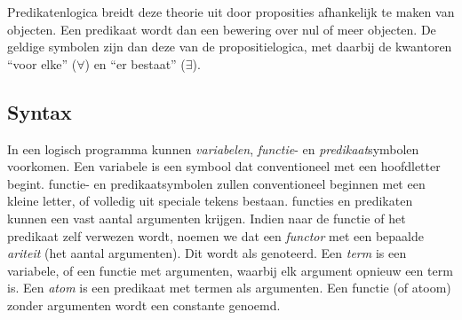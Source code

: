 Predikatenlogica breidt deze theorie uit door proposities afhankelijk te maken van objecten. Een predikaat wordt dan een bewering over nul of meer objecten. De geldige symbolen zijn dan deze van de propositielogica, met daarbij de kwantoren ``voor elke'' ($\forall$) en ``er bestaat'' ($\exists$).

\subsection{Syntax}

In een logisch programma kunnen {\em variabelen}, {\em functie}- en {\em predikaat}symbolen voorkomen. Een variabele is een symbool dat conventioneel met een hoofdletter begint. functie- en predikaatsymbolen zullen conventioneel beginnen met een kleine letter, of volledig uit speciale tekens bestaan. functies en predikaten kunnen een vast aantal argumenten krijgen. Indien naar de functie of het predikaat zelf verwezen wordt, noemen we dat een {\em functor} met een bepaalde {\em ariteit} (het aantal argumenten). Dit wordt als  genoteerd. Een {\em term} is een variabele, of een functie met argumenten, waarbij elk argument opnieuw een term is. Een {\em atom} is een predikaat met termen als argumenten. Een functie (of atoom) zonder argumenten wordt een constante genoemd.

